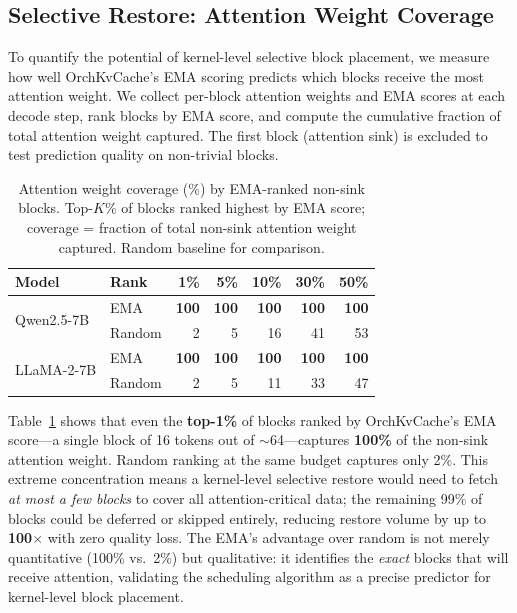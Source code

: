 \documentclass[conference]{IEEEtran}
\begin{document}
\subsection{Selective Restore: Attention Weight Coverage}
\label{sec:selective-restore}

To quantify the potential of kernel-level selective block placement, we measure how well OrchKvCache's EMA scoring predicts which blocks receive the most attention weight. We collect per-block attention weights and EMA scores at each decode step, rank blocks by EMA score, and compute the cumulative fraction of total attention weight captured. The first block (attention sink) is excluded to test prediction quality on non-trivial blocks.

\begin{table}[t]
\centering
\caption{Attention weight coverage (\%) by EMA-ranked non-sink blocks.  Top-$K$\% of blocks ranked highest by EMA score; coverage = fraction of total non-sink attention weight captured.  Random baseline for comparison.}
\label{tab:selective}
\footnotesize
\setlength{\tabcolsep}{9pt}
\begin{tabular}{@{}llrrrrr@{}}
\toprule
Model & Rank & 1\% & 5\% & 10\% & 30\% & 50\% \\
\midrule
\multirow{2}{*}{Qwen2.5-7B}
  & EMA    & \textbf{100} & \textbf{100} & \textbf{100} & \textbf{100} & \textbf{100} \\
  & Random & 2 & 5 & 16 & 41 & 53 \\
\midrule
\multirow{2}{*}{LLaMA-2-7B}
  & EMA    & \textbf{100} & \textbf{100} & \textbf{100} & \textbf{100} & \textbf{100} \\
  & Random & 2 & 5 & 11 & 33 & 47 \\
\bottomrule
\end{tabular}
\end{table}

Table~\ref{tab:selective} shows that even the \textbf{top-1\%} of blocks ranked by OrchKvCache's EMA score---a single block of 16 tokens out of ${\sim}$64---captures \textbf{100\%} of the non-sink attention weight.  Random ranking at the same budget captures only 2\%.  This extreme concentration means a kernel-level selective restore would need to fetch \emph{at most a few blocks} to cover all attention-critical data; the remaining 99\% of blocks could be deferred or skipped entirely, reducing restore volume by up to \textbf{100$\times$} with zero quality loss.  The EMA's advantage over random is not merely quantitative (100\% vs.\ 2\%) but qualitative: it identifies the \emph{exact} blocks that will receive attention, validating the scheduling algorithm as a precise predictor for kernel-level block placement.
\end{document}

